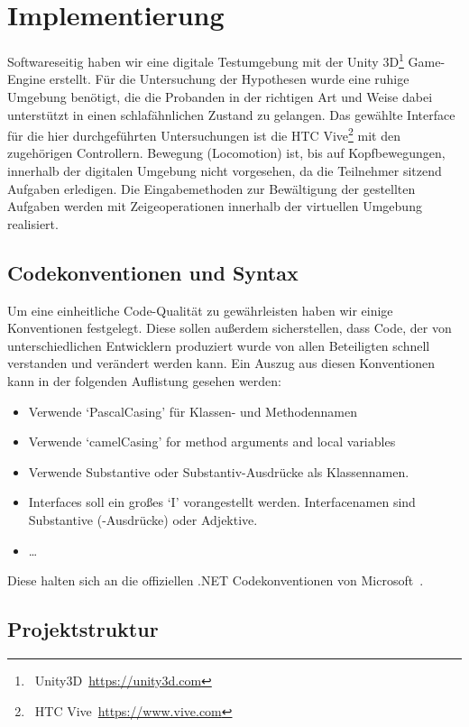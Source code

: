 \chapter{Implementierung}

Softwareseitig haben wir eine digitale Testumgebung mit der Unity 3D\footnote{~Unity3D~\url{https://unity3d.com}} Game-Engine erstellt. Für die Untersuchung der Hypothesen wurde eine ruhige Umgebung benötigt, die die Probanden in der richtigen Art und Weise dabei unterstützt in einen schlafähnlichen Zustand zu gelangen. 
Das gewählte Interface für die hier durchgeführten Untersuchungen ist die HTC Vive\footnote{~HTC Vive~\url{https://www.vive.com}} mit den zugehörigen Controllern. 
Bewegung (Locomotion) ist, bis auf Kopfbewegungen, innerhalb der digitalen Umgebung nicht vorgesehen, da die Teilnehmer sitzend Aufgaben erledigen. 
Die Eingabemethoden zur Bewältigung der gestellten Aufgaben werden mit Zeigeoperationen innerhalb der virtuellen Umgebung realisiert. 

\section{Codekonventionen und Syntax}

Um eine einheitliche Code-Qualität zu gewährleisten haben wir einige Konventionen festgelegt. Diese sollen außerdem sicherstellen, dass Code, der von unterschiedlichen Entwicklern produziert wurde von allen Beteiligten schnell verstanden und verändert werden kann.
Ein Auszug aus diesen Konventionen kann in der folgenden Auflistung gesehen werden: 
\begin{itemize}
    \item Verwende `PascalCasing' für Klassen- und Methodennamen
    \item Verwende `camelCasing' for method arguments and local variables
    \item Verwende Substantive oder Substantiv-Ausdrücke als Klassennamen.
    \item Interfaces soll ein großes `I' vorangestellt werden. Interfacenamen sind Substantive (-Ausdrücke) oder Adjektive.
    \item \ldots
\end{itemize}

Diese halten sich an die offiziellen .NET Codekonventionen von Microsoft~\cite{online:condeConventions}.

\section{Projektstruktur}

